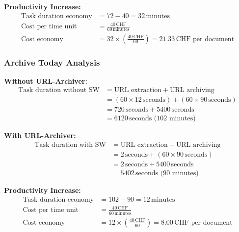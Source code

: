 \textbf{Productivity Increase:}
\begin{align*}
    \text{Task duration economy} &= 72 - 40 = 32\, \text{minutes} \\
    \text{Cost per time unit} &= \frac{40\, \text{CHF}}{60\, \text{minutes}} \\
    \text{Cost economy} &= 32 \times \left( \frac{40\, \text{CHF}}{60} \right) = 21.33\, \text{CHF per document}
\end{align*}

\subsubsection{Archive Today Analysis}
\textbf{Without URL-Archiver:}
\begin{align*}
    \text{Task duration without SW} &= \text{URL extraction} + \text{URL archiving} \\
    &= (60 \times 12\, \text{seconds}) + (60 \times 90\, \text{seconds}) \\
    &= 720\, \text{seconds} + 5400\, \text{seconds} \\
    &= 6120\, \text{seconds (102 minutes)}
\end{align*}

\textbf{With URL-Archiver:}
\begin{align*}
    \text{Task duration with SW} &= \text{URL extraction} + \text{URL archiving} \\
    &= 2\, \text{seconds} + (60 \times 90\, \text{seconds}) \\
    &= 2\, \text{seconds} + 5400\, \text{seconds} \\
    &= 5402\, \text{seconds (90 minutes)}
\end{align*}

\textbf{Productivity Increase:}
\begin{align*}
    \text{Task duration economy} &= 102 - 90 = 12\, \text{minutes} \\
    \text{Cost per time unit} &= \frac{40\, \text{CHF}}{60\, \text{minutes}} \\
    \text{Cost economy} &= 12 \times \left( \frac{40\, \text{CHF}}{60} \right) = 8.00\, \text{CHF per document}
\end{align*}
